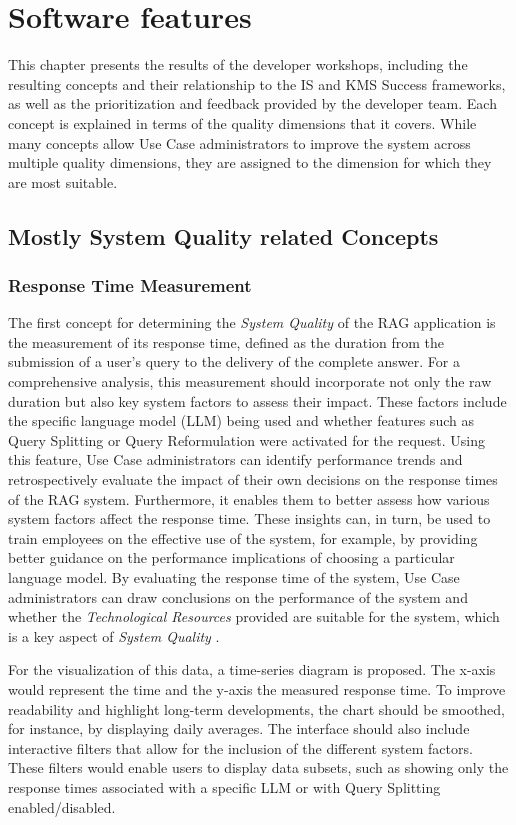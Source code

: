 \documentclass[
	english,
	ruledheaders=section,%
	class=report,%
	thesis={type=bachelor},%
	accentcolor=1b,%
	custommargins=true,%
	marginpar=false,%
	parskip=half-,%
	fontsize=11pt,%
	DIV=14,
]{tudapub}
\begin{document}
\section{Software features}
This chapter presents the results of the developer workshops, including the resulting concepts and their relationship to the IS \parencite{DeloneMcLean2003ISSuccessTenYearUpdate} and KMS Success \parencite{Jennex2006} frameworks, as well as the prioritization and feedback provided by the developer team. Each concept is explained in terms of the quality dimensions that it covers. While many concepts allow Use Case administrators to improve the system across multiple quality dimensions, they are assigned to the dimension for which they are most suitable.
\subsection{Mostly System Quality related Concepts}
\subsubsection{Response Time Measurement}
The first concept for determining the \textit{System Quality} of the RAG application is the measurement of its response time, defined as the duration from the submission of a user's query to the delivery of the complete answer. For a comprehensive analysis, this measurement should incorporate not only the raw duration but also key system factors to assess their impact. These factors include the specific language model (LLM) being used and whether features such as Query Splitting or Query Reformulation were activated for the request. Using this feature, Use Case administrators can identify performance trends and retrospectively evaluate the impact of their own decisions on the response times of the RAG system. Furthermore, it enables them to better assess how various system factors affect the response time. These insights can, in turn, be used to train employees on the effective use of the system, for example, by providing better guidance on the performance implications of choosing a particular language model. By evaluating the response time of the system, Use Case administrators can draw conclusions on the performance of the system and whether the \textit{Technological Resources} provided are suitable for the system, which is a key aspect of \textit{System Quality} \parencite[p.~56--57]{Jennex2006}.

For the visualization of this data, a time-series diagram is proposed. The x-axis would represent the time and the y-axis the measured response time. To improve readability and highlight long-term developments, the chart should be smoothed, for instance, by displaying daily averages. The interface should also include interactive filters that allow for the inclusion of the different system factors. These filters would enable users to display data subsets, such as showing only the response times associated with a specific LLM or with Query Splitting enabled/disabled.
\end{document}
